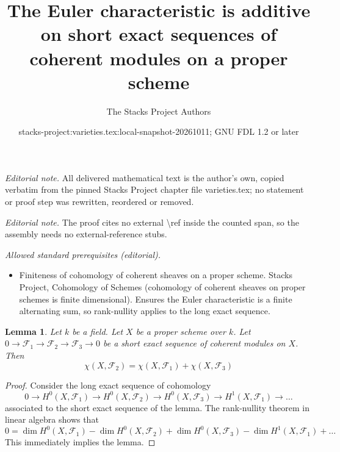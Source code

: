 \documentclass[10pt,a4paper]{amsart}
\title{The Euler characteristic is additive on short exact sequences of coherent modules on a proper scheme}
\author{The Stacks Project Authors}
\date{stacks-project:varieties.tex:local-snapshot-20261011; GNU FDL 1.2 or later}
\theoremstyle{plain}
\newtheorem{lemma}[subsection]{Lemma}
\theoremstyle{definition}
\theoremstyle{remark}
\numberwithin{equation}{subsection}
\begin{document}
\maketitle
\noindent\textit{Editorial note.} All delivered mathematical text is the author's own, copied verbatim from the pinned Stacks Project chapter file varieties.tex; no statement or proof step was rewritten, reordered or removed.\par\medskip
\noindent\textit{Editorial note.} The proof cites no external \textbackslash{}ref inside the counted span, so the assembly needs no external-reference stubs.\par\medskip
\noindent\textit{Allowed standard prerequisites (editorial).}\begin{itemize}
\item Finiteness of cohomology of coherent sheaves on a proper scheme. Stacks Project, Cohomology of Schemes (cohomology of coherent sheaves on proper schemes is finite dimensional). Ensures the Euler characteristic is a finite alternating sum, so rank-nullity applies to the long exact sequence.
\end{itemize}\medskip
\begin{lemma}
\label{lemma-euler-characteristic-additive}
Let $k$ be a field. Let $X$ be a proper scheme over $k$.
Let $0 \to \mathcal{F}_1 \to \mathcal{F}_2 \to \mathcal{F}_3 \to 0$
be a short exact sequence of coherent modules on $X$. Then
$$
\chi(X, \mathcal{F}_2) = \chi(X, \mathcal{F}_1) + \chi(X, \mathcal{F}_3)
$$
\end{lemma}

\begin{proof}
Consider the long exact sequence of cohomology
$$
0 \to H^0(X, \mathcal{F}_1) \to H^0(X, \mathcal{F}_2) \to
H^0(X, \mathcal{F}_3) \to H^1(X, \mathcal{F}_1) \to \ldots
$$
associated to the short exact sequence of the lemma. The rank-nullity theorem
in linear algebra shows that
$$
0 = \dim H^0(X, \mathcal{F}_1) - \dim H^0(X, \mathcal{F}_2)
+ \dim H^0(X, \mathcal{F}_3) - \dim H^1(X, \mathcal{F}_1) + \ldots
$$
This immediately implies the lemma.
\end{proof}
\end{document}
